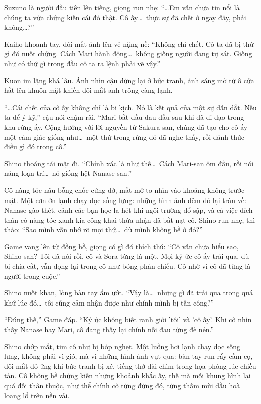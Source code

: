 \documentclass[../main.tex]{subfiles}
\begin{document}
Suzuno là người đầu tiên lên tiếng, giọng run nhẹ: ``\dots Em vẫn chưa tin nổi là chúng ta vừa chứng kiến cái đó thật. Cô ấy\dots\ thực sự đã chết ở ngay đây, phải không\dots?''

Kaiho khoanh tay, đôi mắt ánh lên vẻ nặng nề: ``Không chỉ chết. Cô ta đã bị thứ gì đó nuốt chửng. Cách Mari hành động\dots\ không giống người đang tự sát. Giống như có thứ gì trong đầu cô ta ra lệnh phải vẽ vậy.''

Kuon im lặng khá lâu. Ánh nhìn cậu dừng lại ở bức tranh, ánh sáng mờ từ ô cửa hắt lên khuôn mặt khiến đôi mắt anh trông càng lạnh.

``\dots Cái chết của cô ấy không chỉ là bi kịch. Nó là kết quả của một sự dẫn dắt. Nếu ta để ý kỹ,'' cậu nói chậm rãi, ``Mari bắt đầu đau đầu sau khi đã đi dạo trong khu rừng ấy. Cộng hưởng với lời nguyền từ Sakura-san, chúng đã tạo cho cô ấy một cảm giác giống như\dots\ một thứ trong rừng đó đã nghe thấy, rồi đánh thức điều gì đó trong cô.''

Shino thoáng tái mặt đi. ``Chính xác là như thế\dots\ Cách Mari-san ôm đầu, rồi nói năng loạn trí\dots\ nó giống hệt Nanase-san.''

Cô nàng tóc nâu bỗng chốc cứng đờ, mắt mở to nhìn vào khoảng không trước mặt. Một cơn ớn lạnh chạy dọc sống lưng: những hình ảnh đêm đó lại tràn về: Nanase gào thét, cảnh các bạn học la hét khi ngôi trường đổ sập, và cả việc đích thân cô nàng tóc xanh kia công khai thừa nhận đã bắt nạt cô. Shino run nhẹ, thì thào: ``Sao mình vẫn nhớ rõ mọi thứ\dots\ dù mình không hề ở đó?''

Game vang lên từ đồng hồ, giọng có gì đó thích thú: ``Cô vẫn chưa hiểu sao, Shino-san? Tôi đã nói rồi, cô và Sora từng là một. Mọi ký ức cô ấy trải qua, dù bị chia cắt, vẫn đọng lại trong cô như bóng phản chiếu. Cô nhớ vì cô đã từng là người trong cuộc.''

Shino nuốt khan, lòng bàn tay ẩm ướt. ``Vậy là\dots\ những gì đã trải qua trong quá khứ lúc đó\dots\ tôi cũng cảm nhận được như chính mình bị tấn công?''

``Đúng thế,'' Game đáp. ``Ký ức không biết ranh giới 'tôi' và 'cô ấy'. Khi cô nhìn thấy Nanase hay Mari, cô đang thấy lại chính nỗi đau từng đè nén.''

Shino chớp mắt, tim cô như bị bóp nghẹt. Một luồng hơi lạnh chạy dọc sống lưng, không phải vì gió, mà vì những hình ảnh vụt qua: bàn tay run rẩy cầm cọ, đôi mắt đỏ ửng khi bức tranh bị xé, tiếng thở dài chìm trong họa phòng lúc chiều tàn. Cô không hề chứng kiến những khoảnh khắc ấy, thế mà mỗi khung hình lại quá đỗi thân thuộc, như thể chính cô từng đứng đó, từng thấm mùi dầu hoà loang lổ trên nền vải.
\end{document}

